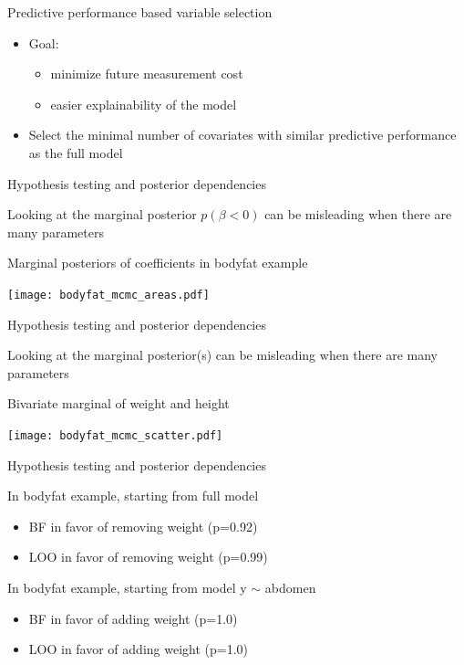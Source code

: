 \documentclass[english,t]{beamer}
\begin{document}
\begin{frame}{Predictive performance based variable selection}

  \begin{itemize}
  \item Goal:
    \begin{itemize}
    \item minimize future measurement cost
    \item easier explainability of the model
    \end{itemize}
  \item<2-> Select the minimal number of covariates with similar
    predictive performance as the full model
  \end{itemize}

\end{frame}

\begin{frame}{Hypothesis testing and posterior dependencies}

  \vspace{-0.5\baselineskip}
  Looking at the marginal posterior $p(\beta < 0)$ can be misleading when there
  are many parameters
  
  Marginal posteriors of coefficients in bodyfat example
  
  \texttt{[image: bodyfat\_mcmc\_areas.pdf]}

\end{frame}

\begin{frame}{Hypothesis testing and posterior dependencies}

  \vspace{-0.75\baselineskip}
  Looking at the marginal posterior(s) can be misleading when there
  are many parameters

  Bivariate marginal of weight and height
  
  \vspace{-0.25\baselineskip}
  \texttt{[image: bodyfat\_mcmc\_scatter.pdf]}

\end{frame}

\begin{frame}{Hypothesis testing and posterior dependencies}

  In bodyfat example, starting from full model

  \begin{itemize}
  \item BF in favor of removing weight (p=0.92)
  \item LOO in favor of removing weight (p=0.99)
  \end{itemize}

  In bodyfat example, starting from model y $\sim$ abdomen
  \begin{itemize}
  \item BF in favor of adding weight (p=1.0)
  \item LOO in favor of adding weight (p=1.0)
  \end{itemize}

\end{frame}
\end{document}
